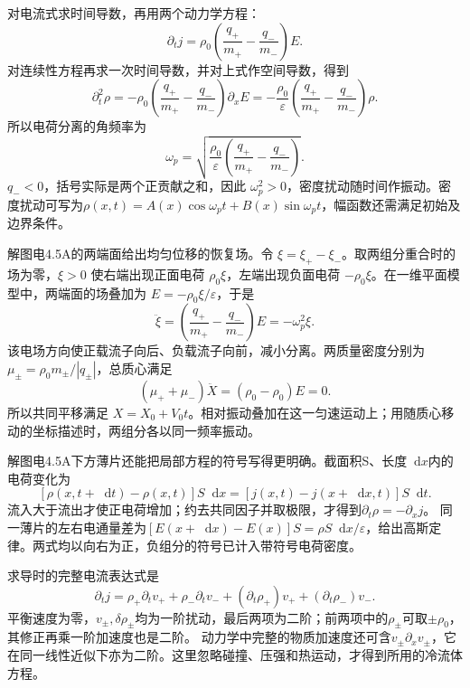 \documentclass[UTF8,fontset=fandol,a4paper,11pt]{ctexart}
\newcommand{\dd}{\mathop{}\!\mathrm{d}}
\begin{document}
对电流式求时间导数，再用两个动力学方程：
\[
\partial_tj=\rho_0\left(\frac{q_+}{m_+}-\frac{q_-}{m_-}\right)E.
\]
对连续性方程再求一次时间导数，并对上式作空间导数，得到
\[
\partial_t^2\rho=-\rho_0\left(\frac{q_+}{m_+}-\frac{q_-}{m_-}\right)\partial_xE
=-\frac{\rho_0}{\varepsilon}\left(\frac{q_+}{m_+}-\frac{q_-}{m_-}\right)\rho.
\]
所以电荷分离的角频率为
\[
\boxed{\omega_p=\sqrt{\frac{\rho_0}{\varepsilon}\left(\frac{q_+}{m_+}-\frac{q_-}{m_-}\right)}}.
\]
$q_-<0$，括号实际是两个正贡献之和，因此 $\omega_p^2>0$，密度扰动随时间作振动。密度扰动可写为$\rho(x,t)=A(x)\cos\omega_pt+B(x)\sin\omega_pt$，幅函数还需满足初始及边界条件。

解图电4.5A的两端面给出均匀位移的恢复场。令 $\xi=\xi_+-\xi_-$。取两组分重合时的场为零，$\xi>0$ 使右端出现正面电荷 $\rho_0\xi$，左端出现负面电荷 $-\rho_0\xi$。在一维平面模型中，两端面的场叠加为 $E=-\rho_0\xi/\varepsilon$，于是
\[
\ddot\xi=\left(\frac{q_+}{m_+}-\frac{q_-}{m_-}\right)E=-\omega_p^2\xi.
\]
该电场方向使正载流子向后、负载流子向前，减小分离。两质量密度分别为$\mu_\pm=\rho_0m_\pm/|q_\pm|$，总质心满足
\[
(\mu_++\mu_-)\ddot X=(\rho_0-\rho_0)E=0.
\]
所以共同平移满足 $X=X_0+V_0t$。相对振动叠加在这一匀速运动上；用随质心移动的坐标描述时，两组分各以同一频率振动。


解图电4.5A下方薄片还能把局部方程的符号写得更明确。截面积S、长度$\dd x$内的电荷变化为
\[
[\rho(x,t+\dd t)-\rho(x,t)]S\dd x=[j(x,t)-j(x+\dd x,t)]S\dd t.
\]
流入大于流出才使正电荷增加；约去共同因子并取极限，才得到$\partial_t\rho=-\partial_xj$。
同一薄片的左右电通量差为$[E(x+\dd x)-E(x)]S=\rho S\dd x/\varepsilon$，给出高斯定律。两式均以向右为正，负组分的符号已计入带符号电荷密度。

求导时的完整电流表达式是
\[
\partial_tj=\rho_+\partial_tv_++\rho_-\partial_tv_-+
(\partial_t\rho_+)v_++(\partial_t\rho_-)v_-.
\]
平衡速度为零，$v_\pm,\delta\rho_\pm$均为一阶扰动，最后两项为二阶；前两项中的$\rho_\pm$可取$\pm\rho_0$，其修正再乘一阶加速度也是二阶。
动力学中完整的物质加速度还可含$v_\pm\partial_xv_\pm$，它在同一线性近似下亦为二阶。这里忽略碰撞、压强和热运动，才得到所用的冷流体方程。
\end{document}
